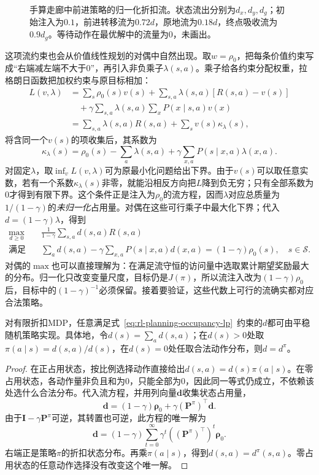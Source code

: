 \begin{figure}[htbp]
 \centering
 
 \caption{手算走廊中前进策略的归一化折扣流。状态流出分别为$d_x,d_y,d_g$；初始注入为$0.1$，前进转移流为$0.72d$，原地流为$0.18d$，终点吸收流为$0.9d_g$。等待动作在最优解中的流量为0，未画出。}
 \label{fig:rl-planning-occupancy-flow}
\end{figure}

这项流约束也会从价值线性规划的对偶中自然出现。取$w=\rho_0$，把每条价值约束写成“右端减左端不大于0”，再引入非负乘子$\lambda(s,a)$。乘子给各约束分配权重，拉格朗日函数把加权约束与原目标相加：
\[
 \begin{aligned}
 L(v,\lambda)
 &=\sum_s\rho_0(s)v(s)
 +\sum_{s,a}\lambda(s,a)[R(s,a)-v(s)]\\
 &\quad+\gamma\sum_{s,a}\lambda(s,a)\sum_xP(x\mid s,a)v(x)\\
 &=\sum_{s,a}\lambda(s,a)R(s,a)+\sum_s v(s)\kappa_\lambda(s),
 \end{aligned}
 \]
将含同一个$v(s)$的项收集后，其系数为
\[
 \kappa_\lambda(s)=\rho_0(s)-\sum_a\lambda(s,a)
       +\gamma\sum_{x,a}P(s\mid x,a)\lambda(x,a).
\]
对固定$\lambda$，取$\inf_v L(v,\lambda)$可为原最小化问题给出下界。由于$v(s)$可以取任意实数，若有一个系数$\kappa_\lambda(s)$非零，就能沿相反方向把$L$降到负无穷；只有全部系数为0才得到有限下界。这个条件正是注入为$\rho_0$的流方程，因而$\lambda$对应总质量为$1/(1-\gamma)$的\emph{未归一化}占用量。对偶在这些可行乘子中最大化下界；代入$d=(1-\gamma)\lambda$，得到
\begin{equation}
 \begin{aligned}
 \max_{d\geq0}\quad&
 \frac{1}{1-\gamma}\sum_{s,a}d(s,a)R(s,a)\\
 \text{满足}\quad&
 \sum_a d(s,a)-\gamma\sum_{x,a}P(s\mid x,a)d(x,a)
   =(1-\gamma)\rho_0(s),\quad s\in\mathcal S.
 \end{aligned}
 \label{eq:rl-planning-occupancy-lp}
\end{equation}
对偶的$\max$也可以直接理解为：在满足流守恒的访问量中选取累计期望奖励最大的分布。归一化只改变变量尺度，目标仍是$J(\pi)$，所以流注入改为$(1-\gamma)\rho_0$后，目标中的$(1-\gamma)^{-1}$必须保留。接着要验证，这些代数上可行的流确实都对应合法策略。

\begin{theorem}[可行占用量的策略实现]
 \label{thm:rl-planning-occupancy-realization}
 对有限折扣MDP，任意满足式~\eqref{eq:rl-planning-occupancy-lp}~约束的$d$都可由平稳随机策略实现。具体地，令$d(s)=\sum_a d(s,a)$；在$d(s)>0$处取$\pi(a\mid s)=d(s,a)/d(s)$，在$d(s)=0$处任取合法动作分布，则$d=d^\pi$。
\end{theorem}
\begin{proof}
 在正占用状态，按比例选择动作直接给出$d(s,a)=d(s)\pi(a\mid s)$。在零占用状态，各动作量非负且和为0，只能全部为0，因此同一等式仍成立，不依赖该处选什么合法分布。代入流方程，并用列向量$\bm d$收集状态占用量，
 \[
 \bm d=(1-\gamma)\bm\rho_0+\gamma(\bm P^\pi)^\top\bm d.
 \]
 由于$\bm I-\gamma\bm P^\pi$可逆，其转置也可逆，此方程的唯一解为
 \[
 \bm d=(1-\gamma)\sum_{t=0}^{\infty}
 \gamma^t((\bm P^\pi)^\top)^t\bm\rho_0.
 \]
 右端正是策略$\pi$的折扣状态分布。再乘$\pi(a\mid s)$，得到$d(s,a)=d^\pi(s,a)$。零占用状态的任意动作选择没有改变这个唯一解。
\end{proof}

